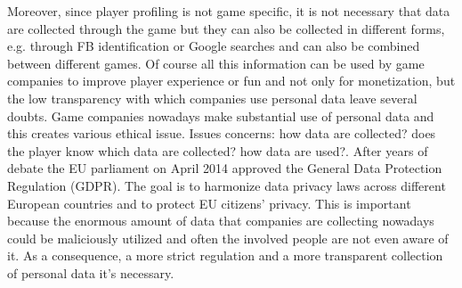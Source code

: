 Moreover, since player profiling is not game specific, it is not necessary that data are collected through the game but they can also be collected in different forms, e.g. through FB identification or Google searches and can also be combined between different games. Of course all this information can be used by game companies to improve player experience or fun and not only for monetization, but the low transparency with which companies use personal data leave several doubts.
Game companies nowadays make substantial use of personal data and this creates various ethical issue. Issues concerns: how data are collected? does the player know which data are collected? how data are used?. After years of debate the EU parliament on April 2014 approved the General Data Protection Regulation (GDPR). The goal is to harmonize data privacy laws across different European countries and to protect EU citizens' privacy. This is important because the enormous amount of data that companies are collecting nowadays could be maliciously utilized and often the involved people are not even aware of it. As a consequence, a more strict regulation and a more transparent collection of personal data it's necessary.






